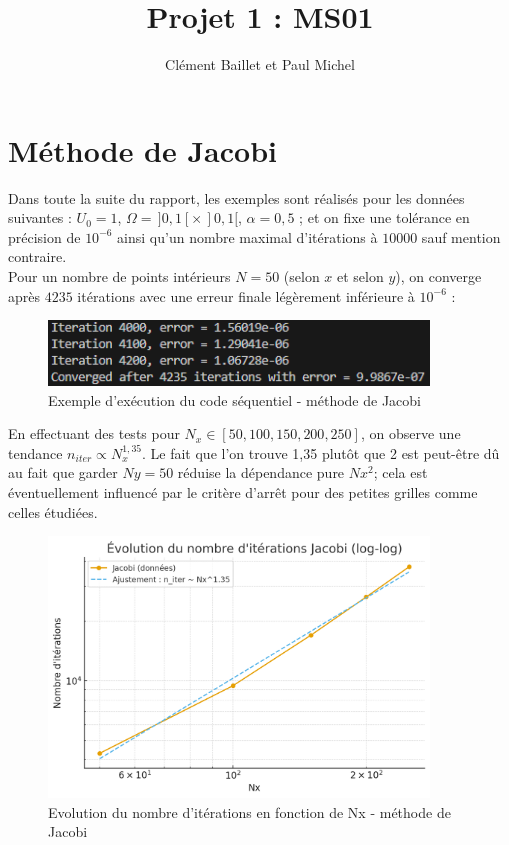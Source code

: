 \documentclass{article}
\title{Projet 1 : MS01}
\author{Clément Baillet et Paul Michel}
\date{}
\begin{document}
\maketitle

\section{Méthode de Jacobi}
Dans toute la suite du rapport, les exemples sont réalisés pour les données suivantes : $U_0 = 1$, $\Omega = \,]0, 1[ \times \,]0, 1[$, $\alpha = 0,5$ ; et on fixe une tolérance en précision de $10^{-6}$ ainsi qu'un nombre maximal d'itérations à $10 000$ sauf mention contraire. \\
Pour un nombre de points intérieurs $N = 50$ (selon $x$ et selon $y$), on converge après $4235$ itérations avec une erreur finale légèrement inférieure à $10^{-6}$ :

\begin{figure}[H]
    \centering
    \includegraphics[width=0.9\textwidth]{test_jacobi_seq.png}
    \caption{Exemple d'exécution du code séquentiel - méthode de Jacobi}
    \label{fig:Jacseq}
\end{figure}

En effectuant des tests  pour $N_x \in [50,100,150,200,250]$, on observe une tendance $n_{iter} \propto N_x^{1,35}$. Le fait que l'on trouve 1,35 plutôt que 2 est peut-être dû au fait que garder $Ny=50$ réduise la dépendance pure $Nx^2$; cela est éventuellement influencé par le critère d'arrêt pour des petites grilles comme celles étudiées.

\begin{figure}[H]
    \centering
    \includegraphics[width=0.9\textwidth]{courbe_log_log_jacobi.png}
    \caption{Evolution du nombre d'itérations en fonction de Nx - méthode de Jacobi}
    \label{fig:loglogJac}
\end{figure}
\end{document}
